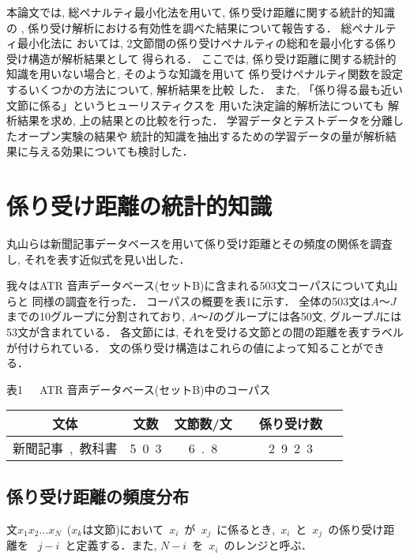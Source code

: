 本論文では, 総ペナルティ最小化法\cite{matsu,ozeki}を用いて, 係り受け距離に関する統計的知識の
, 係り受け解析における有効性を調べた結果について報告する． 総ペナルティ最小化法に
おいては, 2文節間の係り受けペナルティの総和を最小化する係り受け構造が解析結果として
得られる． ここでは, 係り受け距離に関する統計的知識を用いない場合と, そのような知識を用いて
係り受けペナルティ関数を設定するいくつかの方法について, 解析結果を比較
した． また, 「係り得る最も近い文節に係る」というヒューリスティクスを
用いた決定論的解析法\cite{kurohashi}についても
解析結果を求め, 上の結果との比較を行った． 学習データとテストデータを分離したオープン実験の結果や
統計的知識を抽出するための学習データの量が解析結果に与える効果についても検討した\cite{tyou}．

\section{係り受け距離の統計的知識}
丸山らは新聞記事データベースを用いて係り受け距離とその頻度の関係を調査
し, それを表す近似式を見い出した\cite{maruyama}．

我々はATR 音声データベース(セットB)\cite{ATR}に含まれる503文コーパスについて丸山らと
同様の調査を行った． コーパスの概要を表1に示す． 全体の503文は\hspace{-0.25mm}$A〜J$\hspace{-0.25mm}までの10グループに分割されており,
\hspace{-0.5mm}$A〜I$のグループには各50文, グループ$J$には53文が含まれている．
 各文節には, それを受ける文節との間の距離を表すラベルが付けられている．
 文の係り受け構造はこれらの値によって知ることができる．
\begin{center}
{表1\ \ \ ATR 音声データベース(セットB)中のコーパス}
\vspace*{2mm}
\\
\begin{tabular}{|c|c|c|c|}
\hline
文体           & 文数&文節数/文&\ \ 係り受け数\ \ \\ \hline
\hline
新聞記事\ ,\ 教科書   & 5\ 0\ 3 & 6\ .\ 8  &  2\ 9\ 2\ 3   \\ \hline
\end{tabular}
\end{center}
\subsection{係り受け距離の頻度分布}
文$x_1 x_2 ... x_N$\ ($x_k$は文節)において\ $x_i$\ が\ $x_j$\ に係るとき,\ $x_i$\ と\ $x_j$\ の係り受け距離を
\ $j-i$\ と定義する．また, $N-i$\ を\ $x_i$\ のレンジと呼ぶ．


